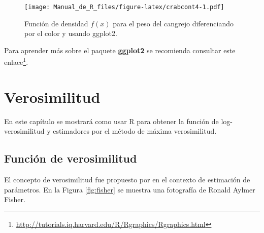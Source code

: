 \documentclass[10pt,]{krantz}
\makeatletter
\newenvironment{Shaded}{\begin{snugshade}}{\end{snugshade}}
\newcommand{\KeywordTok}[1]{\textcolor[rgb]{0.13,0.29,0.53}{\textbf{#1}}}
\newcommand{\DataTypeTok}[1]{\textcolor[rgb]{0.13,0.29,0.53}{#1}}
\newcommand{\DecValTok}[1]{\textcolor[rgb]{0.00,0.00,0.81}{#1}}
\newcommand{\FloatTok}[1]{\textcolor[rgb]{0.00,0.00,0.81}{#1}}
\newcommand{\StringTok}[1]{\textcolor[rgb]{0.31,0.60,0.02}{#1}}
\newcommand{\CommentTok}[1]{\textcolor[rgb]{0.56,0.35,0.01}{\textit{#1}}}
\newcommand{\OperatorTok}[1]{\textcolor[rgb]{0.81,0.36,0.00}{\textbf{#1}}}
\newcommand{\NormalTok}[1]{#1}
\renewcommand{\href}[2]{#2\footnote{\url{#1}}}
\newenvironment{kframe}{%
\medskip{}
\setlength{\fboxsep}{.8em}
 \def\at@end@of@kframe{}%
 \ifinner\ifhmode%
  \def\at@end@of@kframe{\end{minipage}}%
  \begin{minipage}{\columnwidth}%
 \fi\fi%
 \def\FrameCommand##1{\hskip\@totalleftmargin \hskip-\fboxsep
 \colorbox{shadecolor}{##1}\hskip-\fboxsep
     \hskip-\linewidth \hskip-\@totalleftmargin \hskip\columnwidth}%
 \MakeFramed {\advance\hsize-\width
   \@totalleftmargin\z@ \linewidth\hsize
   \@setminipage}}%
 {\par\unskip\endMakeFramed%
 \at@end@of@kframe}
\renewenvironment{Shaded}{\begin{kframe}}{\end{kframe}}
\makeatother
\begin{document}
\begin{Shaded}
\end{Shaded}

\begin{figure}
\centering
\texttt{[image: Manual\_de\_R\_files/figure-latex/crabcont4-1.pdf]}
\caption{\label{fig:crabcont4}Función de densidad \(f(x)\) para el peso del
cangrejo diferenciando por el color y usando ggplot2.}
\end{figure}

Para aprender más sobre el paquete \textbf{ggplot2} se recomienda
consultar este
\href{http://tutorials.iq.harvard.edu/R/Rgraphics/Rgraphics.html}{enlace}.

\chapter{Verosimilitud}\label{loglik}

En este capítulo se mostrará como usar R para obtener la función de
log-verosimilitud y estimadores por el método de máxima verosimilitud.

\section{Función de verosimilitud}\label{funcion-de-verosimilitud}

El concepto de verosimilitud fue propuesto por \citet{Fisher22} en el
contexto de estimación de parámetros. En la Figura \ref{fig:fisher} se
muestra una fotografía de Ronald Aylmer Fisher.
\end{document}
